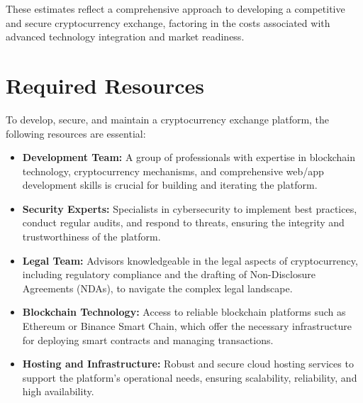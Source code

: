 \documentclass{article}
\begin{document}
	These estimates reflect a comprehensive approach to developing a competitive and secure cryptocurrency exchange, factoring in the costs associated with advanced technology integration and market readiness.
	
	
	\section{Required Resources}
	To develop, secure, and maintain a cryptocurrency exchange platform, the following resources are essential:
	
	\begin{itemize}
		\item \textbf{Development Team:} A group of professionals with expertise in blockchain technology, cryptocurrency mechanisms, and comprehensive web/app development skills is crucial for building and iterating the platform.
		\item \textbf{Security Experts:} Specialists in cybersecurity to implement best practices, conduct regular audits, and respond to threats, ensuring the integrity and trustworthiness of the platform.
		\item \textbf{Legal Team:} Advisors knowledgeable in the legal aspects of cryptocurrency, including regulatory compliance and the drafting of Non-Disclosure Agreements (NDAs), to navigate the complex legal landscape.
		\item \textbf{Blockchain Technology:} Access to reliable blockchain platforms such as Ethereum or Binance Smart Chain, which offer the necessary infrastructure for deploying smart contracts and managing transactions.
		\item \textbf{Hosting and Infrastructure:} Robust and secure cloud hosting services to support the platform's operational needs, ensuring scalability, reliability, and high availability.
	\end{itemize}
	
	
\end{document}

